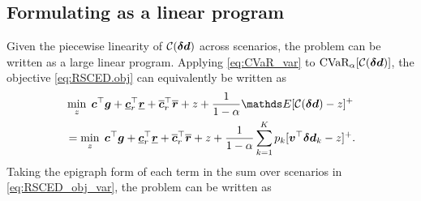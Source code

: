 \subsection{Formulating \RSCED{} as a linear program}\label{sec:formulating}
Given the piecewise linearity of ${\cal C}({\bm{\delta d}})$ across scenarios, the \RSCED{} problem can be written as a large linear program. 
Applying \eqref{eq:CVaR_var} to ${\textrm{CVaR}}_{\alpha}[{\cal C}({\bm{\delta d}})]$, the \RSCED{} objective \eqref{eq:RSCED.obj} can equivalently be written as
%
\begin{equation}
\label{eq:RSCED_obj_var}
\begin{aligned}
    & \min_z \; \v{c}^\top \v{g} + \underline{\v{c}}_r^\top \underline{\v{r}} + \overline{\v{c}}_r^\top \overline{\v{r}} + z + \frac{1}{1 - \alpha} \E[\mathcal{C}(\v{\delta d}) - z]^+ \\
    &  = \min_z \; \v{c}^\top \v{g} + \underline{\v{c}}_r^\top \underline{\v{r}} + \overline{\v{c}}_r^\top \overline{\v{r}} + z + \frac{1}{1 - \alpha} \sum_{k = 1}^K p_k [\voll^\top \v{\delta d}_k - z]^+.
\end{aligned}
\end{equation}
%
Taking the epigraph form of each term in the sum over scenarios in \eqref{eq:RSCED_obj_var}, the \RSCED{} problem can be written as
%
